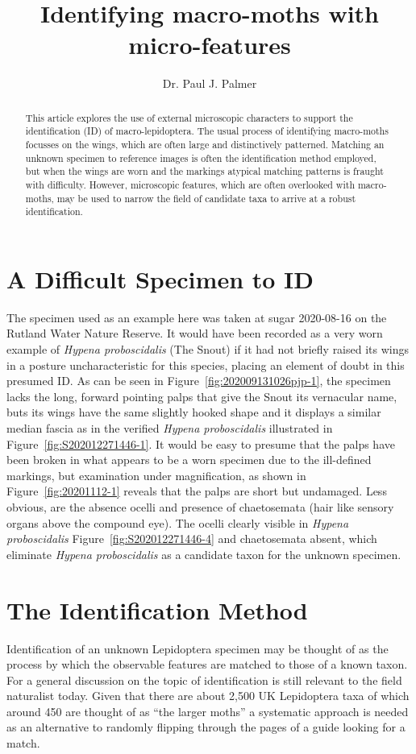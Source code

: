 \documentclass[]{article}
\title{Identifying macro-moths with micro-features}
\author{Dr. Paul J. Palmer}
\begin{document}
\maketitle

\begin{abstract}

This article explores the use of external microscopic characters to support the identification (ID) of  macro-lepidoptera. The usual process of identifying macro-moths  focusses on the wings, which are often large and distinctively patterned. Matching an unknown specimen to reference images is often the identification method employed, but when the wings are worn and the markings atypical matching patterns is fraught with difficulty.
 However, microscopic features, which are often overlooked with macro-moths, may be used to narrow the field of candidate taxa to arrive at a robust identification. 

\end{abstract}

\section*{A Difficult Specimen to ID}
The specimen used as an example here was taken at sugar 2020-08-16 on the Rutland Water Nature Reserve. It would have been recorded as a very worn example of \textit{Hypena proboscidalis} (The Snout) if it had not briefly raised its wings in a posture uncharacteristic for this species, placing an element of doubt in this presumed ID. As can be seen in Figure~\ref{fig:202009131026pjp-1}, the specimen lacks the long, forward pointing palps that give the Snout its vernacular name, buts its wings have the same slightly hooked shape  and it displays a similar median fascia as in the verified \textit{Hypena proboscidalis} illustrated in  Figure~\ref{fig:S202012271446-1}.  It would be easy to presume that the palps have been broken in what appears to be a worn specimen due to the ill-defined markings, but examination under magnification, as shown in  Figure~\ref{fig:20201112-1} reveals that the palps are short but undamaged. Less obvious,  are the absence ocelli and presence of chaetosemata (hair like sensory organs above the compound eye). The ocelli clearly visible in \textit{Hypena proboscidalis} Figure~\ref{fig:S202012271446-4} and chaetosemata absent,  which  eliminate \textit{Hypena proboscidalis} as a candidate taxon for the unknown specimen.

\section*{The Identification Method}
Identification of an unknown Lepidoptera specimen may be thought of as the process by which the  observable features are matched to those of a known taxon.
For a general discussion on the topic of identification \cite{Pankhurst1978} is still relevant to the field naturalist today.
 Given that there are about 2,500 UK Lepidoptera taxa of which around 450 are thought of as \enquote{the larger moths} a systematic approach is needed as an alternative to randomly flipping through the pages of a guide looking for a match.
 
\end{document}
